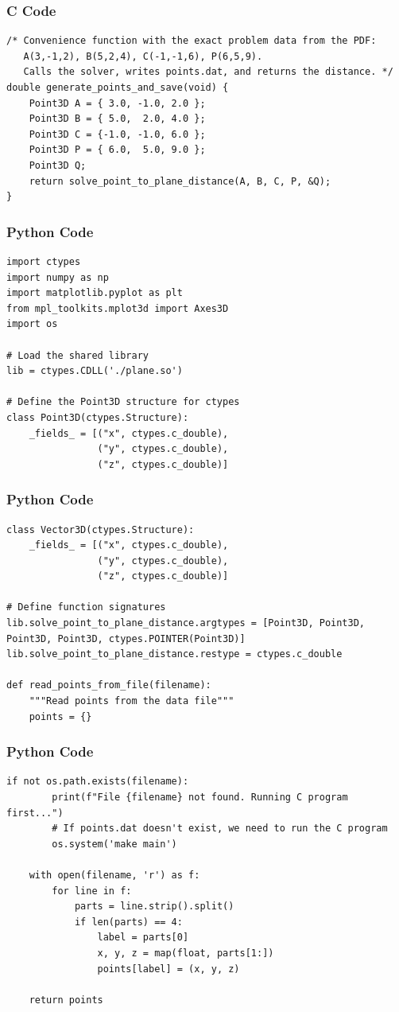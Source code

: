 \documentclass{beamer}
\begin{document}
\begin{frame}[fragile]
    \frametitle{C Code}
    \begin{lstlisting}
/* Convenience function with the exact problem data from the PDF:
   A(3,-1,2), B(5,2,4), C(-1,-1,6), P(6,5,9).
   Calls the solver, writes points.dat, and returns the distance. */
double generate_points_and_save(void) {
    Point3D A = { 3.0, -1.0, 2.0 };
    Point3D B = { 5.0,  2.0, 4.0 };
    Point3D C = {-1.0, -1.0, 6.0 };
    Point3D P = { 6.0,  5.0, 9.0 };
    Point3D Q;
    return solve_point_to_plane_distance(A, B, C, P, &Q);
}
    \end{lstlisting}
\end{frame}

\begin{frame}[fragile]
    \frametitle{Python Code}
    \begin{lstlisting}
import ctypes
import numpy as np
import matplotlib.pyplot as plt
from mpl_toolkits.mplot3d import Axes3D
import os

# Load the shared library
lib = ctypes.CDLL('./plane.so')

# Define the Point3D structure for ctypes
class Point3D(ctypes.Structure):
    _fields_ = [("x", ctypes.c_double),
                ("y", ctypes.c_double), 
                ("z", ctypes.c_double)]
    \end{lstlisting}
\end{frame}

\begin{frame}[fragile]
    \frametitle{Python Code}
    \begin{lstlisting}
class Vector3D(ctypes.Structure):
    _fields_ = [("x", ctypes.c_double),
                ("y", ctypes.c_double),
                ("z", ctypes.c_double)]

# Define function signatures
lib.solve_point_to_plane_distance.argtypes = [Point3D, Point3D, Point3D, Point3D, ctypes.POINTER(Point3D)]
lib.solve_point_to_plane_distance.restype = ctypes.c_double

def read_points_from_file(filename):
    """Read points from the data file"""
    points = {}
    \end{lstlisting}
\end{frame}

\begin{frame}[fragile]
    \frametitle{Python Code}
    \begin{lstlisting}
if not os.path.exists(filename):
        print(f"File {filename} not found. Running C program first...")
        # If points.dat doesn't exist, we need to run the C program
        os.system('make main')

    with open(filename, 'r') as f:
        for line in f:
            parts = line.strip().split()
            if len(parts) == 4:
                label = parts[0]
                x, y, z = map(float, parts[1:])
                points[label] = (x, y, z)

    return points
    \end{lstlisting}
\end{frame}
\end{document}
